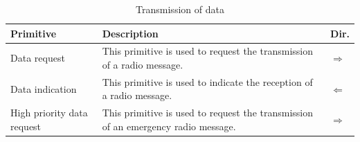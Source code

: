 \documentclass[nocc]{template/openetcs_report}
\begin{document}
			\begin{longtable}{|l|l|l|}
				\caption{Transmission of data}\\ 
				\hline
				
					\begin{minipage}[t]{0.3\linewidth} \textbf{Primitive}	\end{minipage}
				&	\begin{minipage}[t]{0.6\linewidth} \textbf{Description}	\end{minipage}
				&	\begin{minipage}[t]{0.1\linewidth} \textbf{Dir.} \end{minipage} \\
				
				\hline
				
					\begin{minipage}[t]{0.3\linewidth}Data request \end{minipage}
					&\begin{minipage}[t]{0.6\linewidth} This primitive is used to request the transmission of a radio message.	\end{minipage}
					&\begin{minipage}[t]{0.1\linewidth} $\Rightarrow$ \end{minipage} \\
				
				\hline
								
					\begin{minipage}[t]{0.3\linewidth}Data indication \end{minipage}
					&\begin{minipage}[t]{0.6\linewidth} This primitive is used to indicate the reception of a radio message.\end{minipage}
					&\begin{minipage}[t]{0.1\linewidth} $\Leftarrow$ \end{minipage} \\
				
				\hline
													
				\begin{minipage}[t]{0.3\linewidth}High priority data request \end{minipage}
					&\begin{minipage}[t]{0.6\linewidth} This primitive is used to request the transmission of an emergency radio message.	\end{minipage}
					&\begin{minipage}[t]{0.1\linewidth} $\Rightarrow$ \end{minipage} \\
				

\end{longtable}
\end{document}
